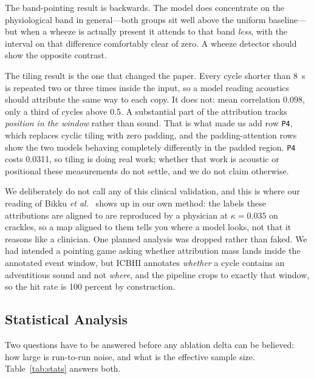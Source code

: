 \documentclass[journal,onecolumn]{IEEEtran}
\begin{document}
The band-pointing result is backwards. The model does concentrate on the physiological band in
general---both groups sit well above the uniform baseline---but when a wheeze is actually
present it attends to that band \emph{less}, with the interval on that difference comfortably
clear of zero. A wheeze detector should show the opposite contrast.

The tiling result is the one that changed the paper. Every cycle shorter than 8~s is repeated
two or three times inside the input, so a model reading acoustics should attribute the same way
to each copy. It does not: mean correlation 0.098, only a third of cycles above 0.5. A
substantial part of the attribution tracks \emph{position in the window} rather than sound.
That is what made us add row \texttt{P4}, which replaces cyclic tiling with zero padding, and
the padding-attention rows show the two models behaving completely differently in the padded
region. \texttt{P4} costs 0.0311, so tiling is doing real work; whether that work is acoustic
or positional these measurements do not settle, and we do not claim otherwise.

We deliberately do not call any of this clinical validation, and this is where our reading of
Bikku \emph{et al.}~\cite{scirep2025cnnrnn} shows up in our own method: the labels these
attributions are aligned to are reproduced by a physician at $\kappa = 0.035$ on crackles, so a
map aligned to them tells you where a model looks, not that it reasons like a clinician. One
planned analysis was dropped rather than faked. We had intended a pointing game asking whether
attribution mass lands inside the annotated event window, but ICBHI annotates \emph{whether} a
cycle contains an adventitious sound and not \emph{where}, and the pipeline crops to exactly
that window, so the hit rate is 100 percent by construction.

\subsection{Statistical Analysis}
\label{subsec:stats}

Two questions have to be answered before any ablation delta can be believed: how large is
run-to-run noise, and what is the effective sample size. Table~\ref{tab:stats} answers both.
\end{document}
